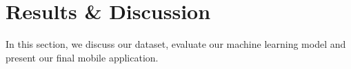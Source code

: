 \section{Results \& Discussion}\label{sec:results}

In this section, we discuss our dataset, evaluate our machine learning model and present our final mobile application.
